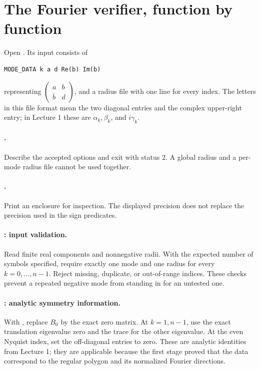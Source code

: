 \section{The Fourier verifier, function by function}
Open . Its input consists of
\begin{lstlisting}
MODE_DATA k a d Re(b) Im(b)
\end{lstlisting}
representing $\begin{pmatrix}a&b\\\overline b&d\end{pmatrix}$, and a
radius file with one  line for every index.
The letters in this file format mean the two diagonal entries and the
complex upper-right entry; in Lecture 1 these are $\alpha_k,\beta_k$,
and $i\gamma_k$.

\paragraph{.}
Describe the accepted options and exit with status $2$. A global radius
and a per-mode radius file cannot be used together.

\paragraph{.}
Print an enclosure for inspection. The displayed precision does not
replace the precision used in the sign predicates.

\paragraph{: input validation.}
Read finite real components and nonnegative radii. With the expected
number of symbols specified, require exactly one mode and one radius
for every $k=0,\ldots,n-1$. Reject missing, duplicate, or out-of-range
indices. These checks prevent a repeated negative mode from standing in
for an untested one.

\paragraph{: analytic symmetry information.}
With , replace $B_0$ by the exact zero
matrix. At $k=1,n-1$, use the exact translation eigenvalue zero and the
trace for the other eigenvalue. At the even Nyquist index, set the
off-diagonal entries to zero. These are analytic identities from Lecture 1;
they are applicable because the first stage proved that the data correspond
to the regular polygon and its normalized Fourier directions.

